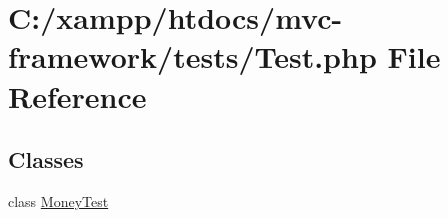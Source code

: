 \hypertarget{tests_2test_8php}{}\section{C\+:/xampp/htdocs/mvc-\/framework/tests/\+Test.php File Reference}
\label{tests_2test_8php}
\subsection*{Classes}
\begin{DoxyCompactItemize}
\item 
class \hyperlink{class_money_test}{Money\+Test}
\end{DoxyCompactItemize}
